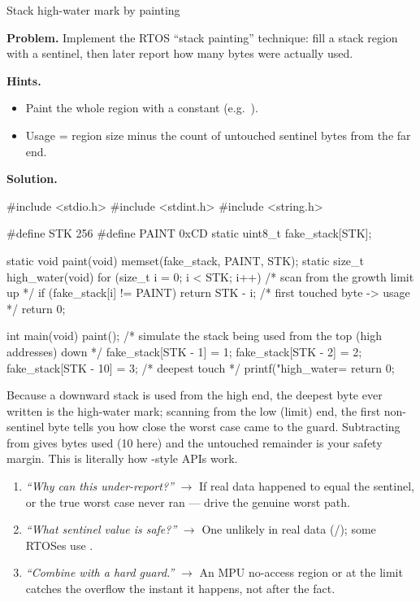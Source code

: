 \begin{gymproblem}{Stack high-water mark by painting}

\textbf{Problem.} Implement the RTOS ``stack painting'' technique: fill a
stack region with a sentinel, then later report how many bytes were actually
used.

\textbf{Hints.}
\begin{itemize}
\item Paint the whole region with a constant (e.g.\ ).
\item Usage = region size minus the count of untouched sentinel bytes from the
  far end.
\end{itemize}

\attempt

\textbf{Solution.}
\begin{cgym}
#include <stdio.h>
#include <stdint.h>
#include <string.h>

#define STK   256
#define PAINT 0xCD
static uint8_t fake_stack[STK];

static void   paint(void) { memset(fake_stack, PAINT, STK); }
static size_t high_water(void) {
    for (size_t i = 0; i < STK; i++)        /* scan from the growth limit up */
        if (fake_stack[i] != PAINT)
            return STK - i;                 /* first touched byte -> usage   */
    return 0;
}

int main(void) {
    paint();
    /* simulate the stack being used from the top (high addresses) down */
    fake_stack[STK - 1] = 1;
    fake_stack[STK - 2] = 2;
    fake_stack[STK - 10] = 3;               /* deepest touch */
    printf("high_water=%
    return 0;
}
\end{cgym}

Because a downward stack is used from the high end, the deepest byte ever
written is the high-water mark; scanning from the low (limit) end, the first
non-sentinel byte tells you how close the worst case came to the guard.
Subtracting from  gives bytes used (10 here) and the untouched
remainder is your safety margin. This is literally how
-style APIs work.

\followups
\begin{enumerate}
\item \emph{``Why can this under-report?''} $\rightarrow$ If real data happened
  to equal the sentinel, or the true worst case never ran --- drive the genuine
  worst path.
\item \emph{``What sentinel value is safe?''} $\rightarrow$ One unlikely in
  real data (/); some RTOSes use .
\item \emph{``Combine with a hard guard.''} $\rightarrow$ An MPU no-access
  region or  at the limit catches the overflow the instant it
  happens, not after the fact.
\end{enumerate}
\end{gymproblem}

